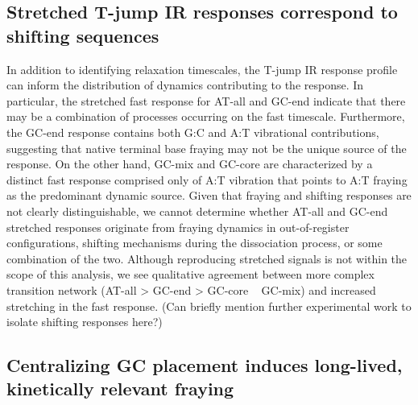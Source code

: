 \documentclass[journal=jpcbfk,manuscript=article]{achemso}
\begin{document}
\subsection{Stretched T-jump IR responses correspond to shifting sequences}


In addition to identifying relaxation timescales, the T-jump IR response profile can inform the distribution of dynamics contributing to the response. In particular, the stretched fast response for AT-all and GC-end indicate that there may be a combination of processes occurring on the fast timescale. Furthermore, the GC-end response contains both G:C and A:T vibrational contributions, suggesting that native terminal base fraying may not be the unique source of the response. On the other hand, GC-mix and GC-core are characterized by a distinct fast response comprised only of A:T vibration that points to A:T fraying as the predominant dynamic source. Given that fraying and shifting responses are not clearly distinguishable, we cannot determine whether AT-all and GC-end stretched responses originate from fraying dynamics in out-of-register configurations, shifting mechanisms during the dissociation process, or some combination of the two. Although reproducing stretched signals is not within the scope of this analysis, we see qualitative agreement between more complex transition network (AT-all > GC-end > GC-core ~ GC-mix) and increased stretching in the fast response. (Can briefly mention further experimental work to isolate shifting responses here?)




\subsection{Centralizing GC placement induces long-lived, kinetically relevant fraying} %
\end{document}

